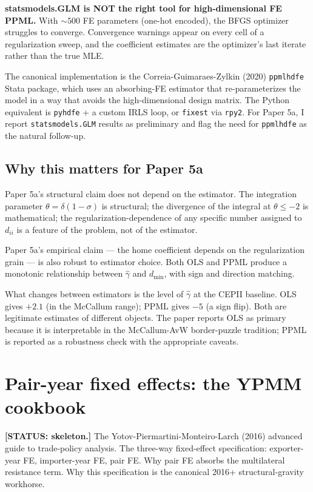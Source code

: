 \documentclass[11pt,letterpaper,oneside]{book}
\theoremstyle{definition}
\theoremstyle{remark}
\begin{document}
\begin{caveat}
\textbf{statsmodels.GLM is NOT the right tool for high-dimensional FE
PPML.} With $\sim 500$ FE parameters (one-hot encoded), the BFGS optimizer
struggles to converge. Convergence warnings appear on every cell of a
regularization sweep, and the coefficient estimates are the optimizer's
last iterate rather than the true MLE.

The canonical implementation is the Correia-Guimaraes-Zylkin (2020)
\texttt{ppmlhdfe} Stata package, which uses an absorbing-FE estimator
that re-parameterizes the model in a way that avoids the high-dimensional
design matrix. The Python equivalent is \texttt{pyhdfe} + a custom IRLS
loop, or \texttt{fixest} via \texttt{rpy2}. For Paper 5a, I report
\texttt{statsmodels.GLM} results as preliminary and flag the need for
\texttt{ppmlhdfe} as the natural follow-up.
\end{caveat}

\section{Why this matters for Paper 5a}

Paper 5a's structural claim does not depend on the estimator. The
integration parameter $\theta = \delta(1-\sigma)$ is structural; the
divergence of the integral at $\theta \leq -2$ is mathematical; the
regularization-dependence of any specific number assigned to $d_{ii}$
is a feature of the problem, not of the estimator.

Paper 5a's empirical claim --- the home coefficient depends on the
regularization grain --- is also robust to estimator choice. Both
OLS and PPML produce a monotonic relationship between $\hat{\gamma}$
and $d_{\min}$, with sign and direction matching.

What changes between estimators is the level of $\hat{\gamma}$ at the
CEPII baseline. OLS gives $+2.1$ (in the McCallum range); PPML gives
$-5$ (a sign flip). Both are legitimate estimates of different
objects. The paper reports OLS as primary because it is interpretable
in the McCallum-AvW border-puzzle tradition; PPML is reported as a
robustness check with the appropriate caveats.

\chapter{Pair-year fixed effects: the YPMM cookbook}

\textbf{[STATUS: skeleton.]} The
Yotov-Piermartini-Monteiro-Larch (2016) advanced guide to trade-policy
analysis. The three-way fixed-effect specification:
exporter-year FE, importer-year FE, pair FE. Why pair FE absorbs the
multilateral resistance term. Why this specification is the canonical
2016+ structural-gravity workhorse.
\end{document}
